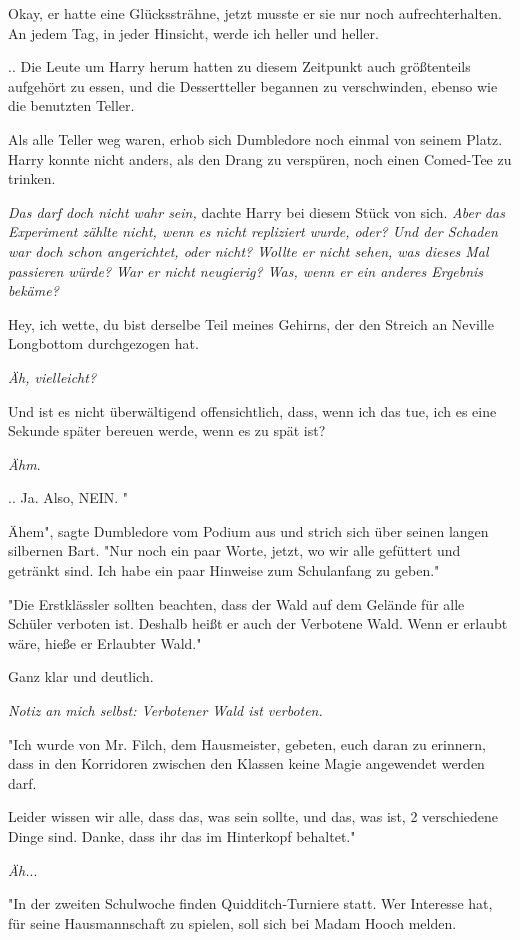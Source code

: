 {Okay, er hatte eine Glückssträhne, jetzt musste er sie nur noch aufrechterhalten. An jedem Tag, in jeder Hinsicht, werde ich heller und heller.

.. Die Leute um Harry herum hatten zu diesem Zeitpunkt auch größtenteils aufgehört zu essen, und die Dessertteller begannen zu verschwinden, ebenso wie die benutzten Teller.

Als alle Teller weg waren, erhob sich Dumbledore noch einmal von seinem Platz. Harry konnte nicht anders, als den Drang zu verspüren, noch einen Comed-Tee zu trinken.

\emph{Das darf doch nicht wahr sein,} dachte Harry bei diesem Stück von sich. \emph{Aber das Experiment zählte nicht, wenn es nicht repliziert wurde, oder? Und der Schaden war doch schon angerichtet, oder nicht? Wollte er nicht sehen, was dieses Mal passieren würde? War er nicht neugierig? Was, wenn er ein anderes Ergebnis bekäme?}

Hey, ich wette, du bist derselbe Teil meines Gehirns, der den Streich an Neville Longbottom durchgezogen hat.

\emph{Äh, vielleicht?}

Und ist es nicht überwältigend offensichtlich, dass, wenn ich das tue, ich es eine Sekunde später bereuen werde, wenn es zu spät ist?

\emph{Ähm}.

.. Ja. Also, NEIN. "

Ähem", sagte Dumbledore vom Podium aus und strich sich über seinen langen silbernen Bart. "Nur noch ein paar Worte, jetzt, wo wir alle gefüttert und getränkt sind. Ich habe ein paar Hinweise zum Schulanfang zu geben."

"Die Erstklässler sollten beachten, dass der Wald auf dem Gelände für alle Schüler verboten ist. Deshalb heißt er auch der Verbotene Wald. Wenn er erlaubt wäre, hieße er Erlaubter Wald."

Ganz klar und deutlich.

\emph{Notiz an mich selbst: Verbotener Wald ist verboten.}

"Ich wurde von Mr. Filch, dem Hausmeister, gebeten, euch daran zu erinnern, dass in den Korridoren zwischen den Klassen keine Magie angewendet werden darf.

Leider wissen wir alle, dass das, was sein sollte, und das, was ist, 2 verschiedene Dinge sind. Danke, dass ihr das im Hinterkopf behaltet."

\emph{Äh.}..

"In der zweiten Schulwoche finden Quidditch-Turniere statt. Wer Interesse hat, für seine Hausmannschaft zu spielen, soll sich bei Madam Hooch melden.

}
